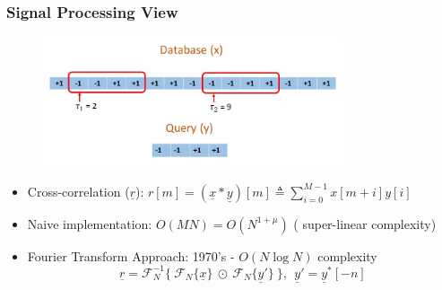 \documentclass[10pt,xcolor=table]{beamer}
\newcommand{\defeq}{\triangleq}
\newcommand{\xv}{\underline{x}}
\newcommand{\yv}{\underline{y}}
\newcommand{\rv}{\underline{r}}
\begin{document}
\begin{frame}\frametitle{Signal Processing View}

	\begin{figure}[t]
		\centering
		\includegraphics[width=3.5in]{Pattern_matching_ex.jpg}
	\end{figure}

			\begin{block}{}			
				\begin{itemize}
					\item {Cross-correlation} ($\rv$): $\displaystyle{r[m]=(\xv*\yv)[m] \defeq \sum_{i=0}^{M-1} x[m+i] y[i] }$
			        \pause
					\item {Naive implementation}: $O(MN) = O(N^{1+\mu})$ ({\color{blue} super-linear} complexity)
                    \pause
					\item {Fourier Transform Approach}: 1970's - $O(N \log N)$ complexity
					\begin{equation}\nonumber
					\rv = \mathcal{F}_{N}^{-1} \{~  \mathcal{F}_{N}\{\xv\} ~ \odot ~  \mathcal{F}_{N}\{\yv'\} ~ \}, \ \ \yv' = \yv^{*}[-n]
					\end{equation}
					
				\end{itemize}
			\end{block}												
\end{frame}
\end{document}
